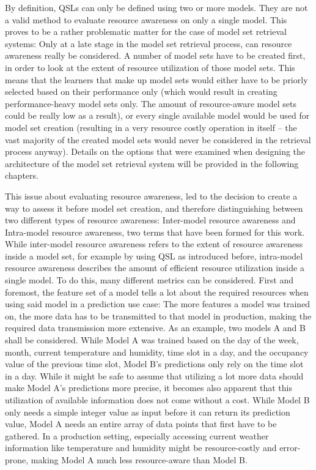 By definition, QSLs can only be defined using two or more models. They are not a valid method to evaluate resource awareness on only a single model. This proves to be a rather problematic matter for the case of model set retrieval systems: Only at a late stage in the model set retrieval process, can resource awareness really be considered. A number of model sets have to be created first, in order to look at the extent of resource utilization of those model sets. This means that the learners that make up model sets would either have to be priorly selected based on their performance only (which would result in creating performance-heavy model sets only. The amount of resource-aware model sets could be really low as a result), or every single available model would be used for model set creation (resulting in a very resource costly operation in itself – the vast majority of the created model sets would never be considered in the retrieval process anyway). Details on the options that were examined when designing the architecture of the model set retrieval system will be provided in the following chapters.

This issue about evaluating resource awareness, led to the decision to create a way to assess it before model set creation, and therefore distinguishing between two different types of resource awareness: Inter-model resource awareness and Intra-model resource awareness, two terms that have been formed for this work. While inter-model resource awareness refers to the extent of resource awareness inside a model set, for example by using QSL as introduced before, intra-model resource awareness describes the amount of efficient resource utilization inside a single model. To do this, many different metrics can be considered. First and foremost, the feature set of a model tells a lot about the required resources when using said model in a prediction use case: The more features a model was trained on, the more data has to be transmitted to that model in production, making the required data transmission more extensive. As an example, two models A and B shall be considered. While Model A was trained based on the day of the week, month, current temperature and humidity, time slot in a day, and the occupancy value of the previous time slot, Model B's predictions only rely on the time slot in a day. While it might be safe to assume that utilizing a lot more data should make Model A’s predictions more precise, it becomes also apparent that this utilization of available information does not come without a cost. While Model B only needs a simple integer value as input before it can return its prediction value, Model A needs an entire array of data points that first have to be gathered. In a production setting, especially accessing current weather information like temperature and humidity might be resource-costly and error-prone, making Model A much less resource-aware than Model B. 

